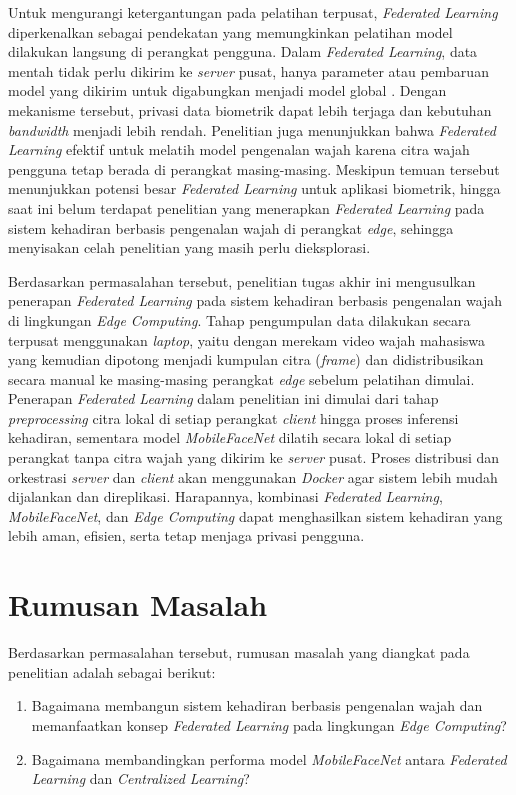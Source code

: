 Untuk mengurangi ketergantungan pada pelatihan terpusat, \textit{Federated Learning} diperkenalkan sebagai pendekatan yang memungkinkan pelatihan model dilakukan langsung di perangkat pengguna. Dalam \textit{Federated Learning}, data mentah tidak perlu dikirim ke \textit{server} pusat, hanya parameter atau pembaruan model yang dikirim untuk digabungkan menjadi model global \parencite{Stano2025}. Dengan mekanisme tersebut, privasi data biometrik dapat lebih terjaga dan kebutuhan \textit{bandwidth} menjadi lebih rendah. Penelitian \textcite{Kim2021} juga menunjukkan bahwa \textit{Federated Learning} efektif untuk melatih model pengenalan wajah karena citra wajah pengguna tetap berada di perangkat masing-masing. Meskipun temuan tersebut menunjukkan potensi besar \textit{Federated Learning} untuk aplikasi biometrik, hingga saat ini belum terdapat penelitian yang menerapkan \textit{Federated Learning} pada sistem kehadiran berbasis pengenalan wajah di perangkat \textit{edge}, sehingga menyisakan celah penelitian yang masih perlu dieksplorasi.

Berdasarkan permasalahan tersebut, penelitian tugas akhir ini mengusulkan penerapan \textit{Federated Learning} pada sistem kehadiran berbasis pengenalan wajah di lingkungan \textit{Edge Computing}. Tahap pengumpulan data dilakukan secara terpusat menggunakan \textit{laptop}, yaitu dengan merekam video wajah mahasiswa yang kemudian dipotong menjadi kumpulan citra (\textit{frame}) dan didistribusikan secara manual ke masing-masing perangkat \textit{edge} sebelum pelatihan dimulai. Penerapan \textit{Federated Learning} dalam penelitian ini dimulai dari tahap \textit{preprocessing} citra lokal di setiap perangkat \textit{client} hingga proses inferensi kehadiran, sementara model \textit{MobileFaceNet} dilatih secara lokal di setiap perangkat tanpa citra wajah yang dikirim ke \textit{server} pusat. Proses distribusi dan orkestrasi \textit{server} dan \textit{client} akan menggunakan \textit{Docker} agar sistem lebih mudah dijalankan dan direplikasi. Harapannya, kombinasi \textit{Federated Learning}, \textit{MobileFaceNet}, dan \textit{Edge Computing} dapat menghasilkan sistem kehadiran yang lebih aman, efisien, serta tetap menjaga privasi pengguna.

\section{Rumusan Masalah}
\label{sec:rumusan-masalah}

Berdasarkan permasalahan tersebut, rumusan masalah yang diangkat pada penelitian adalah sebagai berikut:
\begin{enumerate}[itemsep=1pt]
    \item Bagaimana membangun sistem kehadiran berbasis pengenalan wajah dan memanfaatkan konsep \textit{Federated Learning} pada lingkungan \textit{Edge Computing}?
    \item Bagaimana membandingkan performa model \textit{MobileFaceNet} antara \textit{Federated Learning} dan \textit{Centralized Learning}?
\end{enumerate}

